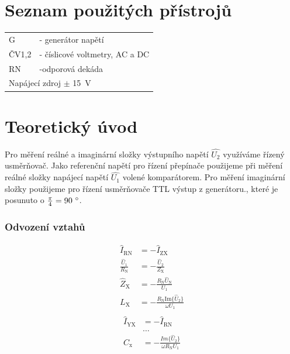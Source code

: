 \documentclass[a4paper,12pt]{article}   %
\begin{document}
\section{Seznam použitých přístrojů}
\label{chap:seznam_pristroju}
\begin{table}[h!]
  \centering
  \begin{tabular}{ll}
    G &- generátor napětí\\
    ČV1,2 &- číslicové voltmetry, AC a DC\\
    RN &-odporová dekáda\\\hline
    \multicolumn{2}{l}{Napájecí zdroj $\pm$ 15~V}\\
  \end{tabular}
\end{table}


\section{Teoretický úvod}
\label{chap:teoreticky_uvod}
Pro měření reálné a imaginární složky výstupního napětí $\hat{U_\text{2}}$ využíváme řízený usměrňovač. Jako referenční napětí pro řízení přepínače použijeme při měření reálné složky napájecí napětí $\hat{U_\text{1}}$ volené komparátorem. Pro měření imaginární složky použijeme pro řízení usměrňovače TTL výstup z generátoru., které je posunuto o $\frac{\pi}{4} = 90~\degree$. 

\subsubsection{Odvození vztahů}
\begin{equation}
  \begin{split}
    \hat{I}_\text{RN} &= -\hat{I}_\text{ZX}\\
    \frac{\hat{U}_\text{1}}{R_\text{N}} &= -\frac{\hat{U}_\text{2}}{Z_\text{X}}\\
    \hat{Z}_\text{X} &= -\frac{R_\text{N}\hat{U}_\text{N}}{U_\text{1}}\\
    L_\text{X} &= -\frac{R_\text{N}\text{Im}\{\hat{U}_\text{2}\}}{\omega U_\text{1}}\\
  \end{split}
\end{equation}
\begin{equation}
  \begin{split}
    \hat{I}_\text{YX} &= -\hat{I}_\text{RN}\\
    &\dots\\
    C_\text{x} &= -\frac{Im\{\hat{U}_\text{2}\}}{\omega R_\text{N}{U}_\text{1}}
  \end{split}
\end{equation}
\end{document}
